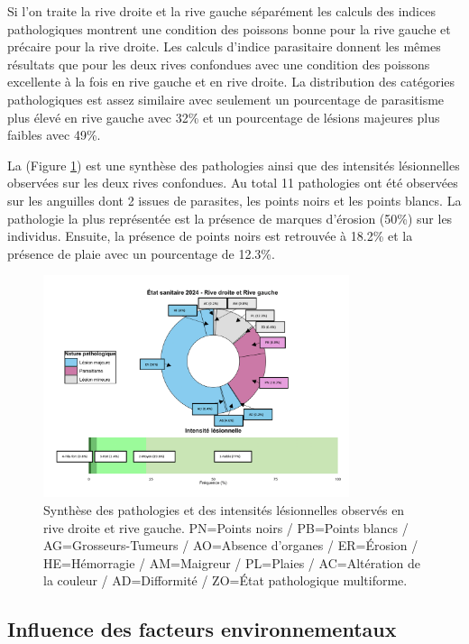 \documentclass[11pt,titlepage,twoside]{article}\usepackage[]{graphicx}\usepackage[table]{xcolor}
\begin{document}
Si l’on traite la rive droite et la rive gauche séparément les calculs des indices pathologiques montrent une condition des poissons \og bonne \fg{} pour la rive gauche et \og précaire \fg{} pour la rive droite. Les calculs d’indice parasitaire donnent les mêmes résultats que pour les deux rives confondues avec une condition des poissons \og excellente \fg{} à la fois en rive gauche et en rive droite. La distribution des catégories pathologiques est assez similaire avec seulement un pourcentage de parasitisme plus élevé en rive gauche avec 32\% et un pourcentage de lésions majeures plus faibles avec 49\%. 

La (Figure \ref{patho}) est une synthèse des pathologies ainsi que des intensités lésionnelles observées sur les deux rives confondues. Au total 11 pathologies ont été observées sur les anguilles dont 2 issues de parasites, les points noirs et les points blancs. La pathologie la plus représentée est la présence de marques d’érosion (50\%) sur les individus. Ensuite, la présence de points noirs est retrouvée à 18.2\% et la présence de plaie avec un pourcentage de 12.3\%.

\begin{figure}[htpb]
\centering
\includegraphics[width=0.8\textwidth]{patho.png}
\caption{Synthèse des pathologies et des intensités lésionnelles observés en rive droite et rive gauche. PN=Points noirs / PB=Points blancs / AG=Grosseurs-Tumeurs / AO=Absence d’organes / ER=Érosion / HE=Hémorragie / AM=Maigreur / PL=Plaies / AC=Altération de la couleur / AD=Difformité / ZO=État pathologique multiforme.}
\label{patho}
\end{figure} 


\subsection{Influence des facteurs environnementaux }
\end{document}

